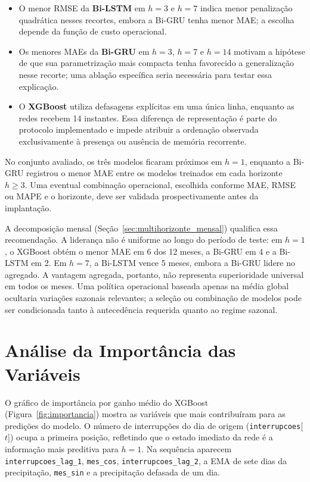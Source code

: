 \begin{itemize}
    \item O menor RMSE da \textbf{Bi-LSTM} em $h=3$ e $h=7$ indica menor penalização quadrática nesses recortes, embora a Bi-GRU tenha menor MAE; a escolha depende da função de custo operacional.
    \item Os menores MAEs da \textbf{Bi-GRU} em $h=3$, $h=7$ e $h=14$ motivam a hipótese de que sua parametrização mais compacta tenha favorecido a generalização nesse recorte; uma ablação específica seria necessária para testar essa explicação.
    \item O \textbf{XGBoost} utiliza defasagens explícitas em uma única linha, enquanto as redes recebem 14 instantes. Essa diferença de representação é parte do protocolo implementado e impede atribuir a ordenação observada exclusivamente à presença ou ausência de memória recorrente.
\end{itemize}

No conjunto avaliado, os três modelos ficaram próximos em $h=1$, enquanto a Bi-GRU registrou o menor MAE entre os modelos treinados em cada horizonte $h \geq 3$. Uma eventual combinação operacional, escolhida conforme MAE, RMSE ou MAPE e o horizonte, deve ser validada prospectivamente antes da implantação.

A decomposição mensal (Seção~\ref{sec:multihorizonte_mensal}) qualifica essa recomendação. A liderança não é uniforme ao longo do período de teste: em $h=1$, o XGBoost obtém o menor MAE em 6 dos 12 meses, a Bi-GRU em 4 e a Bi-LSTM em 2. Em $h=7$, a Bi-LSTM vence 5 meses, embora a Bi-GRU lidere no agregado. A vantagem agregada, portanto, não representa superioridade universal em todos os meses. Uma política operacional baseada apenas na média global ocultaria variações sazonais relevantes; a seleção ou combinação de modelos pode ser condicionada tanto à antecedência requerida quanto ao regime sazonal.

\section{Análise da Importância das Variáveis}

O gráfico de importância por ganho médio do XGBoost (Figura~\ref{fig:importancia}) mostra as variáveis que mais contribuíram para as predições do modelo. O número de interrupções do dia de origem (\texttt{interrupcoes}[$t$]) ocupa a primeira posição, refletindo que o estado imediato da rede é a informação mais preditiva para $h=1$. Na sequência aparecem \texttt{interrupcoes\_lag\_1}, \texttt{mes\_cos}, \texttt{interrupcoes\_lag\_2}, a EMA de sete dias da precipitação, \texttt{mes\_sin} e a precipitação defasada de um dia.

